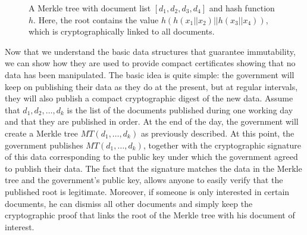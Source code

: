 \begin{figure}
\caption{A Merkle tree with document list $[d_1,d_2,d_3,d_4]$ and hash function $h$. Here, the root contains the value $h(h(x_1||x_2)||h(x_3||x_4))$, which is cryptographically linked to all documents.}%
\label{merkle_fig}
\end{figure}

\medskip
{} Now that we understand the basic data structures that guarantee immutability, we can show how they are used to provide compact certificates showing that no data has been manipulated. The basic idea is quite simple: the government will keep on publishing their data as they do at the present, but at regular intervals, they will also publish a compact cryptographic digest of the new data. Assume that $d_1,d_2,\ldots ,d_k$ is the list of the documents published during one working day and that they are published in order. At the end of the day, the government will create a Merkle tree $MT(d_1,\ldots ,d_k)$ as previously described. At this point, the government publishes $MT(d_1,\ldots ,d_k)$, together with the cryptographic signature of this data corresponding to the public key under which the government agreed to publish their data. The fact that the signature matches the data in the Merkle tree and the government's public key, allows anyone to easily verify that the published root is legitimate. Moreover, if someone is only interested in certain documents, he can dismiss all other documents and simply keep the cryptographic proof that links the root of the Merkle tree with his document of interest.

